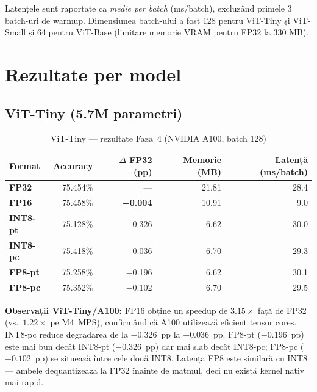\documentclass[12pt,a4paper]{article}
\newcommand{\dpos}[1]{\textcolor{posgreen}{\textbf{#1}}}
\newcommand{\dneg}[1]{\textcolor{negred}{#1}}
\begin{document}
Latențele sunt raportate ca \emph{medie per batch} (ms/batch), excluzând
primele 3 batch-uri de warmup. Dimensiunea batch-ului a fost 128 pentru
ViT-Tiny și ViT-Small și 64 pentru ViT-Base (limitare memorie VRAM pentru
FP32 la 330 MB).

\section{Rezultate per model}

\subsection{ViT-Tiny (5.7M parametri)}

\begin{table}[H]
  \centering
  \caption{ViT-Tiny — rezultate Faza~4 (NVIDIA A100, batch 128)}
  \begin{tabular}{lrrrr}
    \toprule
    \textbf{Format} & \textbf{Accuracy} & \textbf{$\Delta$ FP32 (pp)} &
    \textbf{Memorie (MB)} & \textbf{Latență (ms/batch)} \\
    \midrule
    \textcolor{fp32color}{\textbf{FP32}}    & 75.454\% & ---                   & 21.81 & 28.4 \\
    \textcolor{fp16color}{\textbf{FP16}}    & 75.458\% & \dpos{+0.004}         & 10.91 & \phantom{0}9.0 \\
    \textcolor{int8ptcolor}{\textbf{INT8-pt}} & 75.128\% & \dneg{$-$0.326}    & \phantom{0}6.62 & 30.0 \\
    \textcolor{int8pccolor}{\textbf{INT8-pc}} & 75.418\% & \dneg{$-$0.036}    & \phantom{0}6.70 & 29.3 \\
    \textcolor{fp8ptcolor}{\textbf{FP8-pt}}   & 75.258\% & \dneg{$-$0.196}   & \phantom{0}6.62 & 30.1 \\
    \textcolor{fp8pccolor}{\textbf{FP8-pc}}   & 75.352\% & \dneg{$-$0.102}   & \phantom{0}6.70 & 29.5 \\
    \bottomrule
  \end{tabular}
  \label{tab:tiny}
\end{table}

\textbf{Observații ViT-Tiny/A100:}
FP16 obține un speedup de $\mathbf{3.15\times}$ față de FP32
(vs.\ $1.22\times$ pe M4~MPS), confirmând că A100 utilizează eficient
tensor cores. INT8-pc reduce degradarea de la $-0.326$~pp la $-0.036$~pp.
FP8-pt ($-0.196$~pp) este mai bun decât INT8-pt ($-0.326$~pp) dar mai slab
decât INT8-pc; FP8-pc ($-0.102$~pp) se situează între cele două INT8.
Latența FP8 este similară cu INT8 --- ambele dequantizează la FP32
înainte de matmul, deci nu există kernel nativ mai rapid.
\end{document}

